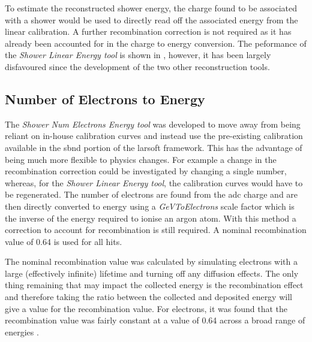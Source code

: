 To estimate the reconstructed shower energy, the charge found to be associated with a shower would be used to directly read off the associated energy from the linear calibration. A further recombination correction is not required as it has already been accounted for in the charge to energy conversion. The peformance of the \textit{Shower Linear Energy tool} is shown in , however, it has been largely disfavoured since the development of the two other reconstruction tools. 

\subsection{Number of Electrons to Energy}\label{subchap:kGeVToElectrons}
The \textit{Shower Num Electrons Energy tool} was developed to move away from being reliant on in-house calibration curves and instead use the pre-existing calibration available in the \Gls{sbnd} portion of the \Gls{larsoft} framework. This has the advantage of being much more flexible to physics changes. For example a change in the recombination correction could be investigated by changing a single number, whereas, for the \textit{Shower Linear Energy tool}, the calibration curves would have to be regenerated. The number of electrons are found from the \gls{adc} charge and are then directly converted to energy using a \textit{GeVToElectrons} scale factor which is the inverse of the energy required to ionise an argon atom. With this method a correction to account for recombination is still required. A nominal recombination value of 0.64 is used for all hits. 

The nominal recombination value was calculated by simulating electrons with a large (effectively infinite) lifetime and turning off any diffusion effects. The only thing remaining that may impact the collected energy is the recombination effect and therefore taking the ratio between the collected and deposited energy will give a value for the recombination value. For electrons, it was found that the recombination value was fairly constant at a value of 0.64 across a broad range of energies \cite{recombination_0.64}. 



\newpage


